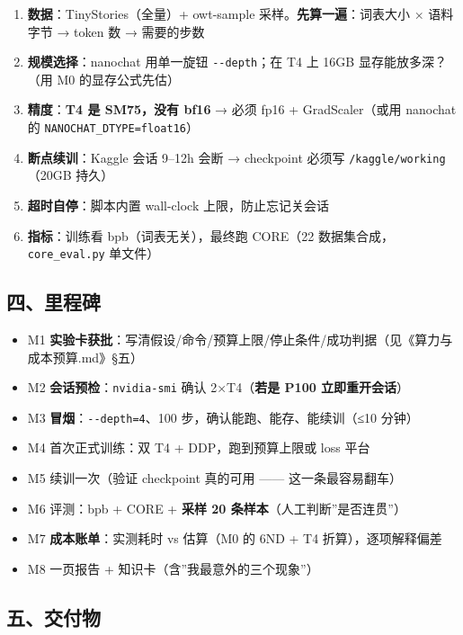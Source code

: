 \documentclass[
  chinese,
  11pt,
]{ctexart}
\providecommand{\tightlist}{%
  \setlength{\itemsep}{0pt}\setlength{\parskip}{0pt}}
\begin{document}
\begin{enumerate}
\def\labelenumi{\arabic{enumi}.}
\tightlist
\item
  \textbf{数据}：TinyStories（全量）+ owt-sample 采样。\textbf{先算一遍}：词表大小 × 语料字节 → token 数 → 需要的步数
\item
  \textbf{规模选择}：nanochat 用单一旋钮 \texttt{-\/-depth}；在 T4 上 16GB 显存能放多深？（用 M0 的显存公式先估）
\item
  \textbf{精度}：\textbf{T4 是 SM75，没有 bf16} → 必须 fp16 + GradScaler（或用 nanochat 的 \texttt{NANOCHAT\_DTYPE=float16}）
\item
  \textbf{断点续训}：Kaggle 会话 9--12h 会断 → checkpoint 必须写 \texttt{/kaggle/working}（20GB 持久）
\item
  \textbf{超时自停}：脚本内置 wall-clock 上限，防止忘记关会话
\item
  \textbf{指标}：训练看 bpb（词表无关），最终跑 CORE（22 数据集合成，\texttt{core\_eval.py} 单文件）
\end{enumerate}

\subsection{四、里程碑}\label{ux56dbux91ccux7a0bux7891}

\begin{itemize}
\tightlist
\item[$\square$]
  M1 \textbf{实验卡获批}：写清假设/命令/预算上限/停止条件/成功判据（见《算力与成本预算.md》§五）
\item[$\square$]
  M2 \textbf{会话预检}：\texttt{nvidia-smi} 确认 2×T4（\textbf{若是 P100 立即重开会话}）
\item[$\square$]
  M3 \textbf{冒烟}：\texttt{-\/-depth=4}、100 步，确认能跑、能存、能续训（≤10 分钟）
\item[$\square$]
  M4 首次正式训练：双 T4 + DDP，跑到预算上限或 loss 平台
\item[$\square$]
  M5 续训一次（验证 checkpoint 真的可用 ------ 这一条最容易翻车）
\item[$\square$]
  M6 评测：bpb + CORE + \textbf{采样 20 条样本}（人工判断''是否连贯''）
\item[$\square$]
  M7 \textbf{成本账单}：实测耗时 vs 估算（M0 的 6ND + T4 折算），逐项解释偏差
\item[$\square$]
  M8 一页报告 + 知识卡（含''我最意外的三个现象''）
\end{itemize}

\subsection{五、交付物}\label{ux4e94ux4ea4ux4ed8ux7269}
\end{document}
